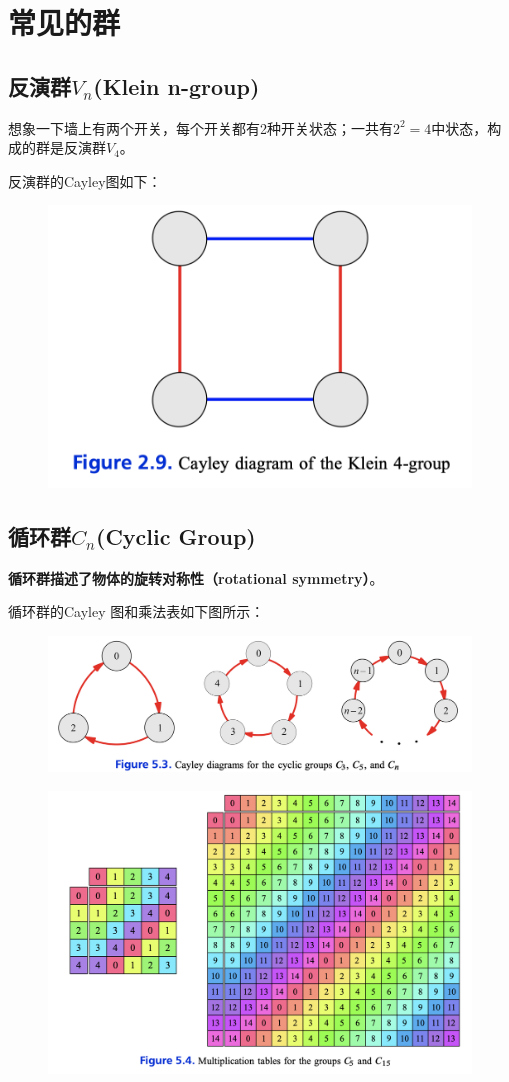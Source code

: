 \documentclass[12pt]{article}
\begin{document}
\section{常见的群}
\subsection{反演群$V_n$(Klein n-group)}
想象一下墙上有两个开关，每个开关都有2种开关状态；一共有$2^2 = 4$中状态，构成的群是反演群$V_4$。

反演群的Cayley图如下：
\begin{figure}[H]
    \centering
    \includegraphics[width=.5\textwidth]{fig/Group/Cayley-V4.png}
\end{figure}

\subsection{循环群$C_n$(Cyclic Group)}
\textbf{循环群描述了物体的旋转对称性（rotational symmetry）}。

循环群的Cayley 图和乘法表如下图所示：
\begin{figure}[H]
    \centering
    \includegraphics[width=1\textwidth]{fig/Group/Cayley-Cyclic-Group-Examples.png}
\end{figure}
\begin{figure}[H]
    \centering
    \includegraphics[width=.8\textwidth]{fig/Group/MultiplicationTable_C5_C15.png}
\end{figure}
\end{document}
